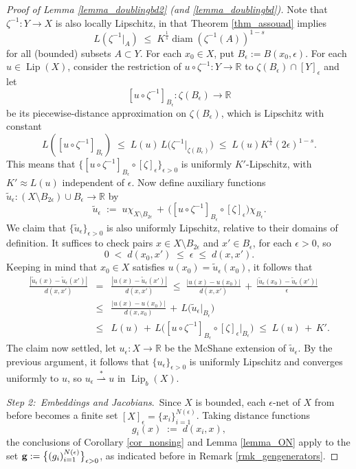 \documentclass[reqno]{amsart}
\theoremstyle{plain}
\theoremstyle{definition}
\theoremstyle{remark}
\numberwithin{equation}{section}
\newcommand{\diam}{\operatorname{diam}}
\newcommand{\e}{\epsilon}
\newcommand{\Lip}{\operatorname{Lip}}
\newcommand{\R}{\mathbb{R}}
\newcommand{\wsto}{\stackrel{*}{\rightharpoonup}}
\begin{document}
\begin{proof}[Proof of Lemma \ref{lemma_doublingbd2} (and \ref{lemma_doublingbd})]
Note that $\zeta^{-1} : Y \to X$ is also locally Lipschitz, in that Theorem \ref{thm_assouad} implies
$$
L(\zeta^{-1}|_A) \;\leq\;
K^\frac{1}{s} \diam(\zeta^{-1}(A))^{1-s}
$$
for all (bounded) subsets $A \subset Y$.
For each $x_0 \in X$, put $B_\e := B(x_0,\e)$.  For each $u \in \Lip(X)$, consider the restriction of $u \circ \zeta^{-1} : Y \to \R$ to $\zeta(B_\e) \cap [Y]_\e$ and let 
$$
[ u \circ \zeta^{-1} ]_{B_\e} : \zeta(B_\e) \to \R
$$
be its piecewise-distance approximation on $\zeta(B_\e)$, which is Lipschitz with constant
$$
L\left( [ u \circ \zeta^{-1} ]_{B_\e} \right) \;\leq\;
L(u) \, L\big( \zeta^{-1}\big|_{\zeta(B_\e)} \big) \;\leq\;
L(u)K^\frac{1}{s}(2\e)^{1-s}.
$$
This means that
$\{ [ u \circ \zeta^{-1}]_{B_\e} \circ [\zeta]_\e \}_{\e > 0}$
is uniformly $K'$-Lipschitz, with $K' \approx L(u)$ independent of $\e$.  Now define auxiliary functions $\tilde{u}_\e : (X \setminus B_{2\e}) \cup B_\e \to \R$ by
\begin{equation} \label{eq_localapprox}
\tilde{u}_\e \;:=\;
u \chi_{X \setminus B_{2\e}} \,+\, \big( [u \circ \zeta^{-1}]_{B_\e} \circ [\zeta]_\e \big) \chi_{B_\e}.
\end{equation}
We claim that $\{ \tilde{u}_\e \}_{\e > 0}$ is also uniformly Lipschitz, relative to their domains of definition.  It suffices to check pairs $x \in X \setminus B_{2\e}$ and $x' \in B_\e$, for each $\e > 0$, so 
$$
0 \;<\; d(x_0,x') \;\leq\; \e \;\leq\; d(x,x').
$$
Keeping in mind that $x_0 \in X$ satisfies $u(x_0) = \tilde{u}_\e(x_0)$,
it follows that
\begin{eqnarray*}
\frac{| \tilde{u}_\e(x) - \tilde{u}_\e(x') |}{d(x,x')} &=&
\frac{|u(x) - \tilde{u}_\e(x')|}{d(x,x')} \;\leq\;
\frac{|u(x) - u(x_0)|}{d(x,x')} \,+\, \frac{\big|\tilde{u}_\e(x_0) - \tilde{u}_\e(x')\big|}{\e} \\ &\leq&
\frac{|u(x) - u(x_0)|}{d(x,x_0)} \,+\, L\big(\tilde{u}_\e\big|_{B_\e}\big) \\ &\leq&
L(u) \,+\, L\Big( [u \circ \zeta^{-1}]_{B_\e} \circ [\zeta]_\e\Big|_{B_\e} \Big) \;\leq\;
L(u) \,+\, K'.
\end{eqnarray*}
The claim now settled, let $u_\e : X \to \R$ be the McShane extension of $\tilde{u}_\e$.  By the previous argument, it follows that $\{u_\e\}_{\e > 0}$ is uniformly Lipschitz and converges uniformly to $u$, so $u_\e \wsto u$ in $\Lip_b(X)$.

\vspace{.05in}
{\em Step 2:\ Embeddings and Jacobians}.\
Since $X$ is bounded, each $\e$-net of $X$ from before becomes a finite set $[X]_\e = \{x_i\}_{i=1}^{N(\e)}$.  Taking distance functions
$$
g_i(x) \;:=\; d(x_i,x),
$$
the conclusions of Corollary \ref{cor_nonsing} and Lemma \ref{lemma_ON} apply to the set ${\bf g} := \big\{(g_i)_{i=1}^{N(\e)}\big\}_{\e>0}$, as indicated before in Remark \ref{rmk_gengenerators}.


\end{proof}
\end{document}
